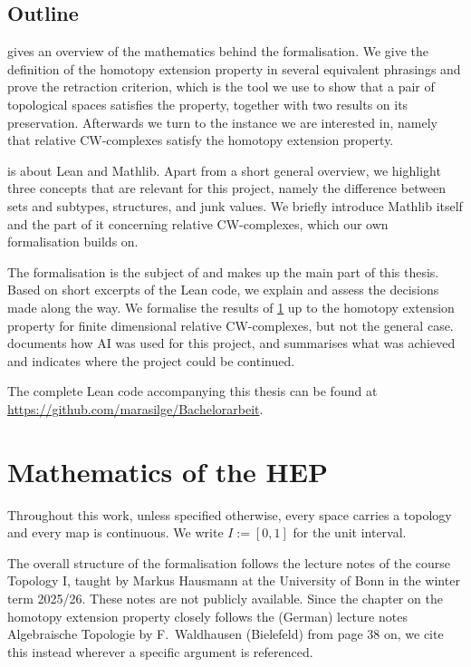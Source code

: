 \documentclass[11pt, a4paper, english]{article}
\theoremstyle{plain}
\theoremstyle{definition}
\theoremstyle{remark}
\numberwithin{equation}{section}
\numberwithin{theorem}{section}
\begin{document}
\subsection*{Outline}
 gives an overview of the mathematics behind the formalisation. We give the definition of the homotopy extension property in several equivalent phrasings and prove the retraction criterion, which is the tool we use to show that a pair of topological spaces satisfies the property, together with two results on its preservation. Afterwards we turn to the instance we are interested in, namely that relative CW-complexes satisfy the homotopy extension property. 

 is about Lean and Mathlib. Apart from  a short general overview, we highlight three concepts that are relevant for this project, namely the difference between sets and subtypes, structures, and junk values. We briefly introduce Mathlib itself and the part of it concerning relative CW-complexes, which our own formalisation builds on. 

The formalisation is the subject of  and makes up the main part of this thesis. Based on short excerpts of the Lean code, we explain and assess the decisions made along the way. We formalise the results of \cref{section:math} up to the homotopy extension property for finite dimensional relative CW-complexes, but not the general case.  documents how AI was used for this project, and  summarises what was achieved and indicates where the project could be continued.

The complete Lean code accompanying this thesis can be found at \url{https://github.com/marasilge/Bachelorarbeit}.

\newpage 
\section {Mathematics of the HEP} \label{section:math}
Throughout this work, unless specified otherwise, every space carries a topology and every map is continuous. We write $I :=[0,1]$ for the unit interval. 

The overall structure of the formalisation follows the lecture notes of the course Topology I, taught by Markus Hausmann at the University of Bonn in the winter term 2025/26. These notes are not publicly available. Since the chapter on the homotopy extension property closely follows the (German) lecture notes Algebraische Topologie by F.\ Waldhausen (Bielefeld) \cite{WAL} from page 38 on, we cite this instead wherever a specific argument is referenced.
\end{document}

